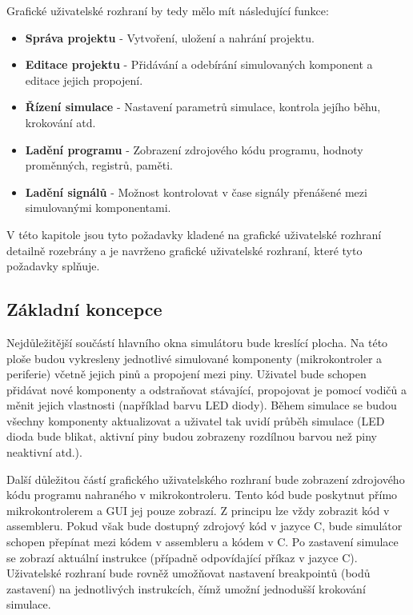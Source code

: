 Grafické uživatelské rozhraní by tedy mělo mít následující funkce:

\begin{itemize}
\item \textbf{Správa projektu} - Vytvoření, uložení a nahrání projektu.
\item \textbf{Editace projektu} - Přidávání a odebírání simulovaných komponent a editace jejich propojení.
\item \textbf{Řízení simulace} - Nastavení parametrů simulace, kontrola jejího běhu, krokování atd.
\item \textbf{Ladění programu} - Zobrazení zdrojového kódu programu, hodnoty proměnných, registrů, paměti.
\item \textbf{Ladění signálů} - Možnost kontrolovat v čase signály přenášené mezi simulovanými komponentami.
\end{itemize}

V této kapitole jsou tyto požadavky kladené na grafické uživatelské rozhraní detailně rozebrány a je navrženo grafické uživatelské rozhraní, které tyto
požadavky splňuje.

\subsection{Základní koncepce}

Nejdůležitější součástí hlavního okna simulátoru bude kreslící plocha. Na této ploše budou vykresleny jednotlivé simulované komponenty (mikrokontroler
a periferie) včetně jejich pinů a propojení mezi piny. Uživatel bude schopen přidávat nové komponenty a odstraňovat stávající, propojovat je pomocí
vodičů a měnit jejich vlastnosti (například barvu LED diody). Během simulace se budou všechny komponenty aktualizovat a uživatel tak uvidí průběh simulace
(LED dioda bude blikat, aktivní piny budou zobrazeny rozdílnou barvou než piny neaktivní atd.).

Další důležitou částí grafického uživatelského rozhraní bude zobrazení zdrojového kódu programu nahraného v mikrokontroleru. Tento kód bude poskytnut
přímo mikrokontrolerem a GUI jej pouze zobrazí. Z principu lze vždy zobrazit kód v assembleru. Pokud však bude dostupný zdrojový kód v jazyce C, bude 
simulátor schopen přepínat mezi kódem v assembleru a kódem v C. Po zastavení simulace se zobrazí aktuální instrukce (případně odpovídající příkaz v jazyce C). Uživatelské rozhraní bude rovněž umožňovat nastavení breakpointů (bodů zastavení) na jednotlivých instrukcích, čímž umožní jednodušší krokování
simulace.

